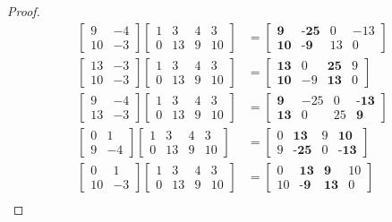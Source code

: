 \documentclass[11pt, a4paper]{article}
\newcommand{\1}{\mathbbm{1}}
\theoremstyle{case}
\begin{document}
\begin{proof}
\begin{align*}
\begin{bmatrix}9 & -4\\ 10 & -3 \end{bmatrix}\begin{bmatrix} 1 & 3 & 4 & 3 \\ 0 & 13 & 9 & 10 \end{bmatrix}&=\begin{bmatrix}\textbf{9} & \textbf{-25} & 0 & -13\\ \textbf{10} & \textbf{-9} & 13 & 0 \end{bmatrix} \\
\begin{bmatrix}13 & -3\\ 10 & -3 \end{bmatrix}\begin{bmatrix} 1 & 3 & 4 & 3 \\ 0 & 13 & 9 & 10 \end{bmatrix}&=\begin{bmatrix}\textbf{13} & 0 & \textbf{25} & 9\\ \textbf{10} & -9 & \textbf{13} & 0 \end{bmatrix} \\
\begin{bmatrix}9 & -4\\13 & -3 \end{bmatrix}\begin{bmatrix} 1 & 3 & 4 & 3 \\ 0 & 13 & 9 & 10 \end{bmatrix}&=\begin{bmatrix}\textbf{9} & -25 & 0 & \textbf{-13}\\ \textbf{13} & 0 & 25 & \textbf{9} \end{bmatrix} \\
\begin{bmatrix}0 & 1\\ 9 & -4 \end{bmatrix}\begin{bmatrix} 1 & 3 & 4 & 3 \\ 0 & 13 & 9 & 10 \end{bmatrix}&=\begin{bmatrix}0 & \textbf{13} & 9 & \textbf{10}\\ 9 & \textbf{-25} & 0 & \textbf{-13} \end{bmatrix} \\
\begin{bmatrix}0 & 1\\ 10 & -3 \end{bmatrix}\begin{bmatrix} 1 & 3 & 4 & 3 \\ 0 & 13 & 9 & 10 \end{bmatrix}&=\begin{bmatrix}0 & \textbf{13} & \textbf{9} & 10\\ 10 & \textbf{-9} & \textbf{13} & 0 \end{bmatrix} \\

\end{align*}
\end{proof}
\end{document}
